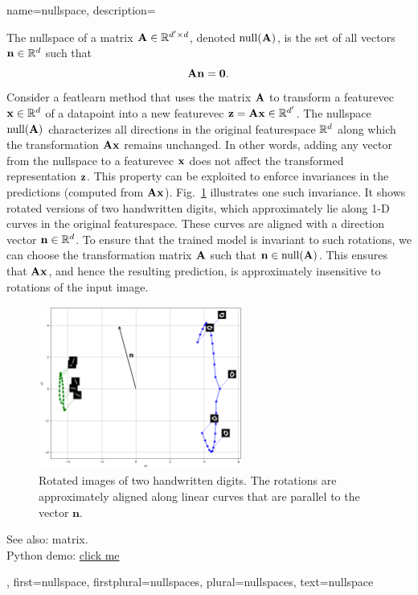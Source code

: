 {name={nullspace},
	description={The nullspace of a \gls{matrix} ${\bf A} \in \mathbb{R}^{d' \times d}$, 
		denoted ${\rm null}({\bf A})$, is the set of all \glspl{vector} $\mathbf{n} \in \mathbb{R}^d$ 
    		such that $${\bf A} \mathbf{n} = \mathbf{0}.$$ 
		Consider a \gls{featlearn} method that uses the \gls{matrix} ${\bf A}$ to transform 
		a \gls{featurevec} $\mathbf{x} \in \mathbb{R}^{d}$ of a \gls{datapoint} 
		into a new \gls{featurevec} ${\bf z} = {\bf A} \mathbf{x} \in \mathbb{R}^{d'}$. 
		The nullspace ${\rm null}({\bf A})$ characterizes all directions in the original 
    		\gls{featurespace} $\mathbb{R}^{d}$ along which the transformation 
		${\bf A} \mathbf{x}$ remains unchanged. In other words, adding any \gls{vector} from 
		the nullspace to a \gls{featurevec} ${\bf x}$ does not affect the transformed 
		representation ${\bf z}$. This property can be exploited to enforce invariances in the 
		\glspl{prediction} (computed from ${\bf A} \mathbf{x}$). Fig.\ \ref{fig:nullspace-rotation-dict} 
		illustrates one such invariance. It shows rotated versions of two handwritten digits, 
		which approximately lie along 1-D curves in the original \gls{featurespace}. 
		These curves are aligned with a direction \gls{vector} $\mathbf{n} \in \mathbb{R}^{d}$. 
    		To ensure that the trained \gls{model} is invariant to such rotations, we can 
		choose the transformation \gls{matrix} ${\bf A}$ such that $\mathbf{n} \in {\rm null}({\bf A})$. 
		This ensures that ${\bf A} \mathbf{x}$, and hence the resulting \gls{prediction}, 
		is approximately insensitive to rotations of the input image.
		\begin{figure}[H]
      			\centering
      			\includegraphics[width=0.6\textwidth]{assets/pythonsnacks/nullspace_0_1.png}
	  		\caption{Rotated images of two handwritten digits. The rotations are approximately 
	  		aligned along linear curves that are parallel to the \gls{vector} $\mathbf{n}$.\label{fig:nullspace-rotation-dict}}	
	       	\end{figure}
		See also: \gls{matrix}. \\ 
		Python demo: \href{https://github.com/AaltoDictionaryofML/AaltoDictionaryofML.github.io/blob/main/assets/pythonsnacks/nullspace.py}{click me}},
 	first={nullspace},
 	firstplural={nullspaces},
 	plural={nullspaces},
 	text={nullspace}
}


